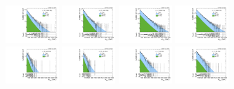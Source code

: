 \begin{figure}[htbp]
  \includegraphics[width=0.18\textwidth]{fig/fitValidation/PostFit_SR_MVV__mu_HP_nobb_HDy_Run2.pdf}
  \includegraphics[width=0.18\textwidth]{fig/fitValidation/PostFit_SR_MVV__e_HP_nobb_HDy_Run2.pdf}
  \includegraphics[width=0.18\textwidth]{fig/fitValidation/PostFit_SR_MVV__mu_LP_nobb_HDy_Run2.pdf}
  \includegraphics[width=0.18\textwidth]{fig/fitValidation/PostFit_SR_MVV__e_LP_nobb_HDy_Run2.pdf}\\
  \includegraphics[width=0.18\textwidth]{fig/fitValidation/PostFit_SR_MVV__mu_HP_vbf_HDy_Run2.pdf}
  \includegraphics[width=0.18\textwidth]{fig/fitValidation/PostFit_SR_MVV__e_HP_vbf_HDy_Run2.pdf}
  \includegraphics[width=0.18\textwidth]{fig/fitValidation/PostFit_SR_MVV__mu_LP_vbf_HDy_Run2.pdf}
  \includegraphics[width=0.18\textwidth]{fig/fitValidation/PostFit_SR_MVV__e_LP_vbf_HDy_Run2.pdf}\\
  \caption{
  }
  \label{fig:postfit_MVV_Run2}
\end{figure}

